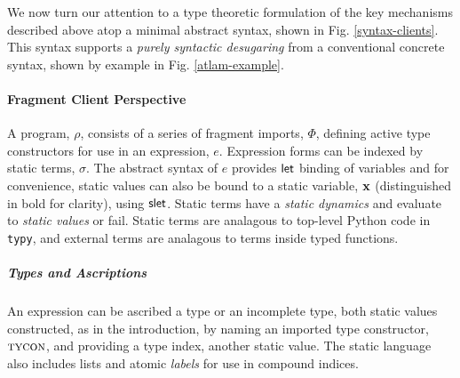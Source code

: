 \documentclass{sigplanconf}
\newcommand{\FF}[1]{{\sf #1}}
\begin{document}


%

We now turn our attention to a type theoretic formulation of the key mechanisms described above atop a minimal abstract syntax, shown in Fig. \ref{syntax-clients}. This syntax supports a \emph{purely syntactic desugaring} from a conventional concrete syntax, shown by example in Fig. \ref{atlam-example}. 

\paragraph{Fragment Client Perspective} A program, $\rho$, consists of a series of fragment imports, $\Phi$, defining active type constructors for use in an expression, $e$. Expression forms can be indexed by static terms, $\sigma$. The abstract syntax of $e$ provides $\FF{let}$ binding of variables and for convenience, static values can also be bound to a static variable, ${\bf x}$ (distinguished in bold for clarity), using $\FF{slet}$. Static terms have a \emph{static dynamics} and evaluate to \emph{static values} or fail. Static terms are analagous to top-level Python code in \verb|typy|, and external terms are analagous to terms inside typed functions.

\subparagraph{Types and Ascriptions} An expression can be ascribed a {type} or an {incomplete type}, both  {static values} constructed, as in the introduction, by naming an imported type constructor, $\textsc{tycon}$, and providing a type index, another static value. The static language also includes lists and atomic \emph{labels} for use in compound indices. %
\end{document}
